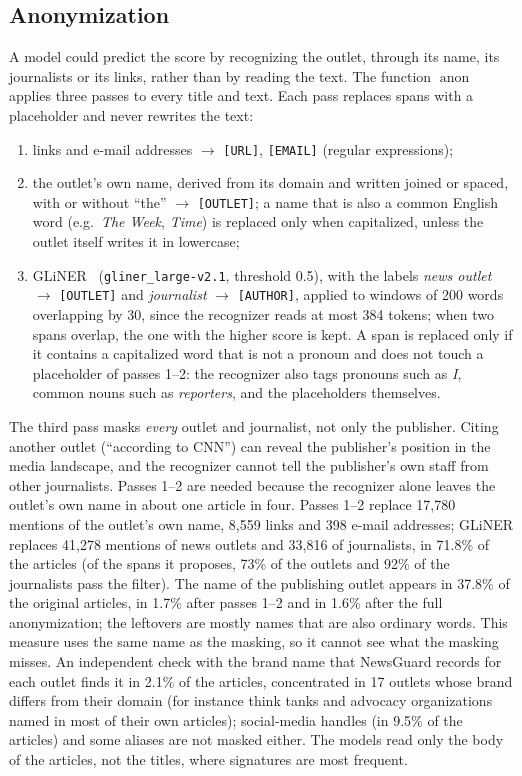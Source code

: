 \documentclass[11pt,a4paper]{article}
\newcommand{\anon}{\operatorname{anon}}
\begin{document}
\subsection{Anonymization}\label{sec:anon}
A model could predict the score by recognizing the outlet, through its name, its journalists or its links, rather
than by reading the text. The function $\anon$ applies three passes to every title and text. Each pass replaces spans
with a placeholder and never rewrites the text:
\begin{enumerate}
  \item links and e-mail addresses $\rightarrow$ \texttt{[URL]}, \texttt{[EMAIL]} (regular expressions);
  \item the outlet's own name, derived from its domain and written joined or spaced, with or without ``the''
        $\rightarrow$ \texttt{[OUTLET]}; a name that is also a common English word (e.g.\ \emph{The Week},
        \emph{Time}) is replaced only when capitalized, unless the outlet itself writes it in lowercase;
  \item GLiNER~\cite{zaratiana2024gliner} (\texttt{gliner\_large-v2.1}, threshold 0.5), with the labels \emph{news
        outlet} $\rightarrow$ \texttt{[OUTLET]} and \emph{journalist} $\rightarrow$ \texttt{[AUTHOR]}, applied to windows
        of 200 words overlapping by 30, since the recognizer reads at most 384 tokens; when two spans overlap, the one
        with the higher score is kept. A span is replaced only if it contains a capitalized word that is not a pronoun
        and does not touch a placeholder of passes 1--2: the recognizer also tags pronouns such as \emph{I}, common
        nouns such as \emph{reporters}, and the placeholders themselves.
\end{enumerate}
The third pass masks \emph{every} outlet and journalist, not only the publisher. Citing another outlet (``according to
CNN'') can reveal the publisher's position in the media landscape, and the recognizer cannot tell the publisher's own
staff from other journalists. Passes 1--2 are needed because the recognizer alone leaves the outlet's own name in
about one article in four. Passes 1--2 replace 17,780 mentions of the outlet's own name, 8,559 links and 398 e-mail
addresses; GLiNER replaces 41,278 mentions of news outlets and 33,816 of journalists, in 71.8\% of the articles (of
the spans it proposes, 73\% of the outlets and 92\% of the journalists pass the filter). The name of the publishing
outlet appears in 37.8\% of the original articles, in 1.7\% after passes 1--2 and in 1.6\% after the full
anonymization; the leftovers are mostly names that are also ordinary words. This measure uses the same name as the
masking, so it cannot see what the masking misses. An independent check with the brand name that NewsGuard records for
each outlet finds it in 2.1\% of the articles, concentrated in 17 outlets whose brand differs from their domain (for
instance think tanks and advocacy organizations named in most of their own articles); social-media handles (in 9.5\%
of the articles) and some aliases are not masked either. The models read only the body of the articles, not the titles,
where signatures are most frequent.
\end{document}

